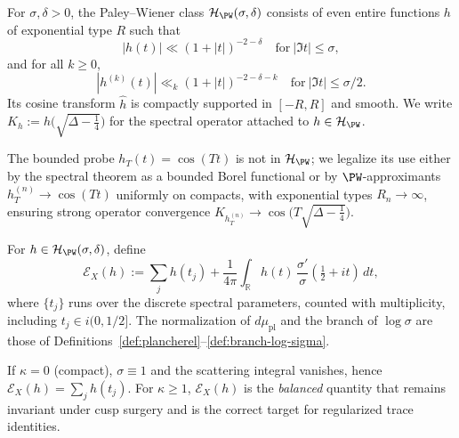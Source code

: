 
\begin{definition}\label{def:tests}
For $\sigma,\delta>0$, the Paley–Wiener class $\mathcal{H}_{\PW}(\sigma,\delta)$
consists of even entire functions $h$ of exponential type $R$ such that
\[
|h(t)|\ll (1+|t|)^{-2-\delta}\quad \text{for}\ |\Im t|\le \sigma,
\]
and for all $k\ge 0$,
\[
|h^{(k)}(t)|\ll_k (1+|t|)^{-2-\delta-k}\quad \text{for}\ |\Im t|\le \sigma/2.
\]
Its cosine transform $\widehat{h}$ is compactly supported in $[-R,R]$ and
smooth. We write $K_h:=h\!\big(\sqrt{\Delta-\tfrac14}\big)$ for the
spectral operator attached to $h\in\mathcal{H}_{\PW}$.                      %
\end{definition}

\begin{remark}\label{rem:wave-legal}
The bounded probe $h_T(t)=\cos(Tt)$ is not in $\mathcal{H}_{\PW}$; we
legalize its use either by the spectral theorem as a bounded Borel
functional or by $\PW$-approximants $h_T^{(n)}\to \cos(Tt)$ uniformly on
compacts, with exponential types $R_n\to\infty$, ensuring strong operator
convergence $K_{h_T^{(n)}}\to \cos\!\big(T\sqrt{\Delta-\tfrac14}\big)$.    %
\end{remark}


\begin{definition}\label{def:balanced-invariant}
For $h\in\mathcal{H}_{\PW}(\sigma,\delta)$, define
\[
\mathcal{E}_X(h):=\sum_j h(t_j)+\frac{1}{4\pi}\int_{\mathbb{R}}
h(t)\,\frac{\sigma'}{\sigma}\!\left(\tfrac12+it\right)\,dt,
\]
where $\{t_j\}$ runs over the discrete spectral parameters, counted with
multiplicity, including $t_j\in i(0,1/2]$. The normalization of
$d\mu_{\mathrm{pl}}$ and the branch of $\log\sigma$ are those of
Definitions~\ref{def:plancherel}--\ref{def:branch-log-sigma}.              %
\end{definition}

\begin{remark}\label{rem:balance}
If $\kappa=0$ (compact), $\sigma\equiv 1$ and the scattering integral
vanishes, hence $\mathcal{E}_X(h)=\sum_j h(t_j)$. For $\kappa\ge 1$,
$\mathcal{E}_X(h)$ is the \emph{balanced} quantity that remains
invariant under cusp surgery and is the correct target for regularized
trace identities.                                                             %
\end{remark}

